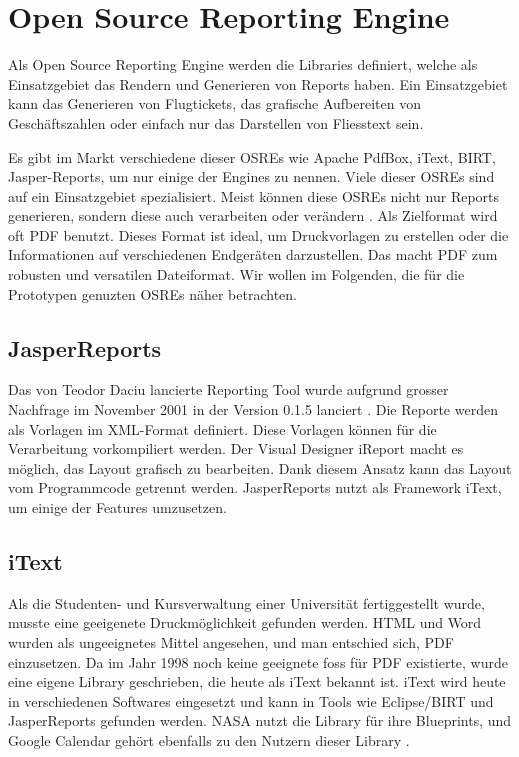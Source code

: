 \documentclass[main.tex]{subfiles}
\begin{document}
\section{Open Source Reporting Engine }



Als Open Source Reporting Engine werden die Libraries definiert, welche als Einsatzgebiet das Rendern und Generieren von Reports haben. Ein Einsatzgebiet kann das Generieren von Flugtickets, das grafische Aufbereiten von Geschäftszahlen oder einfach nur das Darstellen von Fliesstext sein.

Es gibt im Markt verschiedene dieser OSREs wie Apache PdfBox, iText, BIRT, Jasper-Reports, um nur einige der Engines zu nennen. Viele dieser OSREs sind auf ein Einsatzgebiet spezialisiert. Meist können diese OSREs nicht nur Reports generieren, sondern diese auch verarbeiten oder verändern \cite[Kap. ~10]{whitington_2012}. Als Zielformat wird oft PDF benutzt. Dieses Format ist ideal, um Druckvorlagen zu erstellen oder die Informationen auf verschiedenen Endgeräten darzustellen. Das macht PDF zum robusten und versatilen Dateiformat. Wir wollen im Folgenden, die für die Prototypen genuzten OSREs näher betrachten.


\subsection{JasperReports}
Das von Teodor Daciu lancierte Reporting Tool wurde aufgrund grosser Nachfrage im November 2001 in der Version 0.1.5 lanciert \cite[Kap.~1]{heffelfinger_2009}. Die Reporte werden als Vorlagen im XML-Format definiert. Diese Vorlagen können für die Verarbeitung vorkompiliert werden. Der Visual Designer iReport macht es möglich, das Layout grafisch zu bearbeiten. Dank diesem Ansatz kann das Layout vom Programmcode getrennt werden. JasperReports nutzt als Framework iText, um einige der Features umzusetzen. 


\subsection{iText}
Als die Studenten- und Kursverwaltung einer Universität fertiggestellt wurde, musste eine geeigenete Druckmöglichkeit gefunden werden. HTML und Word wurden als ungeeignetes Mittel angesehen, und man entschied sich, PDF einzusetzen. Da im Jahr 1998 noch keine geeignete \acrshort{foss} für PDF existierte, wurde eine eigene Library geschrieben, die heute als iText bekannt ist. iText wird heute in verschiedenen Softwares eingesetzt und kann in Tools wie Eclipse/BIRT und JasperReports gefunden werden. NASA nutzt die Library für ihre Blueprints, und Google Calendar gehört ebenfalls zu den Nutzern dieser Library \cite[Kap.~1]{itexthistory}.
\end{document}
